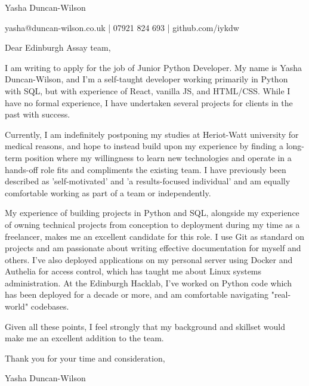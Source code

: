 \documentclass[10pt,a4paper]{article}
\begin{document}
\centerline{\Huge Yasha Duncan-Wilson}

\vspace{5pt}

\centerline{yasha@duncan-wilson.co.uk | 07921 824 693 | github.com/iykdw}

\vspace{32pt}

Dear Edinburgh Assay team,

I am writing to apply for the job of Junior Python Developer. My name is Yasha Duncan-Wilson, and I'm a self-taught developer working primarily in Python with SQL, but with experience of React, vanilla JS, and HTML/CSS. While I have no formal experience, I have undertaken several projects for clients in the past with success.

Currently, I am indefinitely postponing my studies at Heriot-Watt university for medical reasons, and hope to instead build upon my experience by finding a long-term position where my willingness to learn new technologies and operate in a hands-off role fits and compliments the existing team. I have previously been described as 'self-motivated' and 'a results-focused individual' and am equally comfortable working as part of a team or independently.

My experience of building projects in Python and SQL, alongside my experience of owning technical projects from conception to deployment during my time as a freelancer, makes me an excellent candidate for this role. I use Git as standard on projects and am passionate about writing effective documentation for myself and others. I've also deployed applications on my personal server using Docker and Authelia for access control, which has taught me about Linux systems administration. At the Edinburgh Hacklab, I've worked on Python code which has been deployed for a decade or more, and am comfortable navigating "real-world" codebases.

Given all these points, I feel strongly that my background and skillset would make me an excellent addition to the team.

Thank you for your time and consideration,

Yasha Duncan-Wilson
\end{document}
